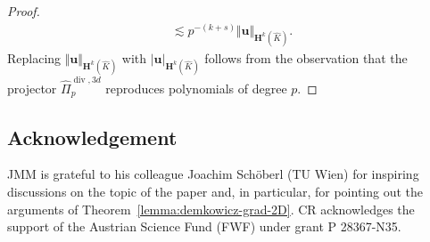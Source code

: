 \documentclass{article}
\newcommand{\hatPicurlcom}{\widehat \Pi^{\operatorname*{curl},3d}_p}
\newcommand{\hatPidivcom}{\widehat\Pi^{\operatorname*{div},3d}_{p}}
\begin{document}
\begin{proof}
\begin{align*}
{\lesssim} p^{-(k+s)} \Vert\mathbf{u}\Vert_{\mathbf{H}^k(\widehat{K})}.
\end{align*} 
Replacing
$\Vert{\mathbf{u}}\Vert_{{\mathbf{H}}^{k}(\widehat{K})}$ with $|{\mathbf{u}%
}|_{{\mathbf{H}}^{k}(\widehat{K})}$ follows from the observation that the
projector $\hatPidivcom$ reproduces polynomials
of degree $p$.
\end{proof}
%
\subsection*{Acknowledgement} JMM is grateful to his colleague 
Joachim Sch\"oberl (TU Wien) for inspiring discussions on the topic 
of the paper and, in particular, for pointing out the arguments of 
Theorem~\ref{lemma:demkowicz-grad-2D}. CR acknowledges the support 
of the Austrian Science Fund (FWF) under grant P 28367-N35. 


\end{document}
